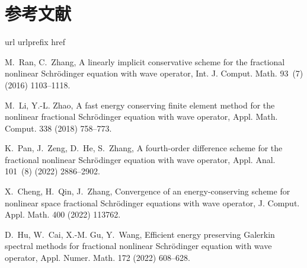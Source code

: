 \documentclass[aspectratio=169]{beamer}
\begin{document}
\section{参考文献}

\begin{frame}[allowframebreaks]
	\scriptsize
%  
% 

\begin{thebibliography}{10}
	\expandafter\ifx\csname url\endcsname\relax
	  \def\url#1{\texttt{#1}}\fi
	\expandafter\ifx\csname urlprefix\endcsname\relax\def\urlprefix{URL }\fi
	\expandafter\ifx\csname href\endcsname\relax
	  \def\href#1#2{#2} \def\path#1{#1}\fi
	
	M.~Ran, C.~Zhang,
	  \href{http://www.tandfonline.com/doi/full/10.1080/00207160.2015.1016924}{A
	  linearly implicit conservative scheme for the fractional nonlinear
	  {{Schr\"odinger}} equation with wave operator}, Int. J. Comput. Math. 93~(7)
	  (2016) 1103--1118.
 
	M.~Li, Y.-L. Zhao,
	  \href{https://linkinghub.elsevier.com/retrieve/pii/S0096300318304983}{A fast
	  energy conserving finite element method for the nonlinear fractional
	  {{Schr\"odinger}} equation with wave operator}, Appl. Math. Comput. 338
	  (2018) 758--773.
 
	K.~Pan, J.~Zeng, D.~He, S.~Zhang,
	  \href{https://doi.org/10.1080/00036811.2020.1829600}{A fourth-order
	  difference scheme for the fractional nonlinear {{Schr\"odinger}} equation
	  with wave operator}, Appl. Anal. 101~(8) (2022) 2886--2902.
	 
	X.~Cheng, H.~Qin, J.~Zhang,
	  \href{https://linkinghub.elsevier.com/retrieve/pii/S0377042721003848}{Convergence
	  of an energy-conserving scheme for nonlinear space fractional
	  {{Schr\"odinger}} equations with wave operator}, J. Comput. Appl. Math. 400
	  (2022) 113762.
 
	D.~Hu, W.~Cai, X.-M. Gu, Y.~Wang,
	  \href{https://linkinghub.elsevier.com/retrieve/pii/S0168927421002981}{Efficient
	  energy preserving {{Galerkin}}\textendash{{Legendre}} spectral methods for
	  fractional nonlinear {{Schr\"odinger}} equation with wave operator}, Appl.
	  Numer. Math. 172 (2022) 608--628.
 

\end{thebibliography}
\end{frame}
\end{document}
